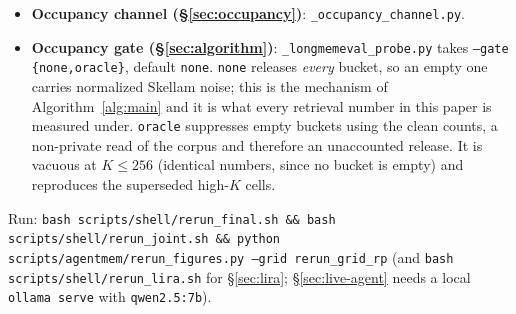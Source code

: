 \documentclass[pdflatex,sn-mathphys-num,iicol]{sn-jnl}
\theoremstyle{thmstyleone}%
\theoremstyle{thmstyletwo}%
\theoremstyle{thmstylethree}%
\newcommand{\secref}[1]{\S\ref{#1}}
\begin{document}
\begin{appendices}
\begin{itemize}
    \texttt{--proj pca} check of \secref{sec:robustness}. Each script has an additive \texttt{--json}
    dump; the crypto path is byte-identical to the released \texttt{privacy\_utils}.
  \item \textbf{Occupancy channel (\secref{sec:occupancy})}: \texttt{\_occupancy\_channel.py}.
  \item \textbf{Occupancy gate (\secref{sec:algorithm})}: \texttt{\_longmemeval\_probe.py} takes
    \texttt{--gate \{none,oracle\}}, default \texttt{none}. \texttt{none} releases \emph{every}
    bucket, so an empty one carries normalized Skellam noise; this is the mechanism of
    Algorithm~\ref{alg:main} and it is what every retrieval number in this paper is measured under.
    \texttt{oracle} suppresses empty buckets using the clean counts, a non-private read of the
    corpus and therefore an unaccounted release. It is vacuous at $K \leq 256$ (identical numbers,
    since no bucket is empty) and reproduces the superseded high-$K$ cells.
\end{itemize}

Run: \texttt{bash scripts/shell/rerun\_final.sh \&\& bash scripts/shell/rerun\_joint.sh \&\& python
scripts/agentmem/rerun\_figures.py --grid rerun\_grid\_rp} (and \texttt{bash
scripts/shell/rerun\_lira.sh} for \secref{sec:lira}; \secref{sec:live-agent} needs a local
\texttt{ollama serve} with \texttt{qwen2.5:7b}).

\end{appendices}

\backmatter
\end{document}

